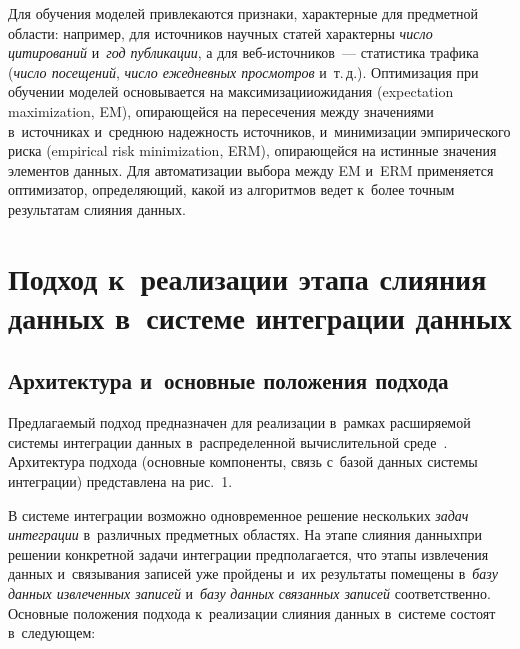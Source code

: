 \begin{multicols}{2}
    Для обучения моделей привлекаются признаки, характерные для 
предметной области: например, для источников научных статей характерны 
\textit{число цитирований} и~\textit{год публикации}, а для  
веб-ис\-точ\-ни\-ков~--- статистика трафика (\textit{число посещений}, 
\textit{число ежедневных просмотров} и~т.\,д.). Оптимизация при обучении 
моделей основывается на максимизации\linebreak ожидания (expectation maximization, 
EM), опи\-ра\-ющей\-ся на пересечения между значениями в~источниках 
и~сред\-нюю на\-деж\-ность источников, и~минимизации эмпирического риска 
(empirical risk \mbox{minimization}, ERM), опи\-ра\-ющей\-ся на истинные значения 
элементов данных. Для автоматизации выбора меж\-ду EM и~ERM 
применяется оптимизатор, опре\-де\-ля\-ющий, какой из алгоритмов ведет к~более 
точ\-ным результатам сли\-я\-ния данных.

\section{Подход к~реализации этапа слияния данных в~системе 
интеграции данных}

\subsection{Архитектура и~основные положения подхода}

    Предлагаемый подход предназначен для реализации в~рамках 
расширяемой системы интеграции данных в~распределенной вычислительной 
\mbox{среде}~\cite{3-ste, 4-ste, 5-ste}. Архитектура подхода (основные компоненты, 
связь с~базой данных системы интеграции) представлена на рис.~1.



     
    В системе интеграции возможно одновременное решение нескольких 
\textit{задач интеграции} в~различных предметных областях. На этапе 
слияния данных\linebreak при решении конкретной задачи интеграции предполагается, 
что этапы извлечения данных и~связывания записей уже пройдены и~их 
результаты помещены в~\textit{базу данных извлеченных записей} 
и~\textit{базу} \mbox{\textit{данных}} \textit{связанных записей} соответственно. Основные 
положения подхода к~реализации слияния данных в~системе состоят  
в~сле\-ду\-ющем:

\pagebreak

\end{multicols}

\begin{figure*} %
 \vspace*{1pt}
\begin{center}
   \mbox{%
\epsfxsize=162.089mm 
}
\end{center}
\vspace*{-3pt}
\vspace*{7pt}
\end{figure*}

